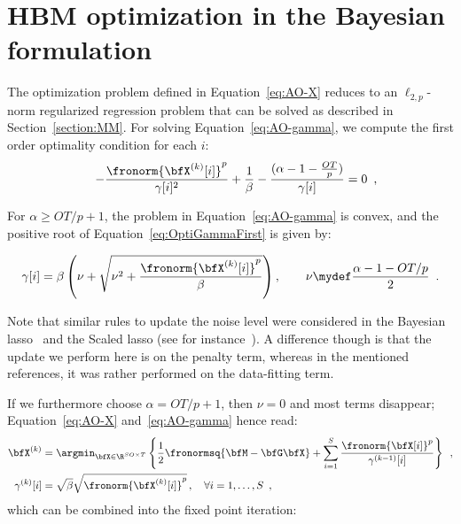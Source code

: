 \section{HBM optimization in the Bayesian formulation}
\label{section:hbm_optim}

The optimization problem defined in Equation~\eqref{eq:AO-X} reduces to an $\ell_{2,p}$-norm regularized regression problem that can be solved as described in Section~\ref{section:MM}. For solving Equation~\eqref{eq:AO-gamma}, we compute the first order optimality condition for each $i$:
\begin{eqnarray}
\label{eq:OptiGamma}
\qquad - \frac{\fronorm{\bfX^{(k)}[i]}^p}{\mathbf{\gamma}[i]^2} + \frac{1}{\beta} - \frac{( \alpha - 1 - \frac{OT}{p})}{\mathbf{\gamma}[i]} &= 0 \enspace,\label{eq:OptiGammaFirst}%
\end{eqnarray}

For $\alpha \geqslant O T/p + 1$, the problem in Equation~\eqref{eq:AO-gamma} is convex, and the positive root of Equation~\eqref{eq:OptiGammaFirst} is given by:

\begin{equation}
\mathbf{\gamma}[i] = \beta \left( \nu + \sqrt{ \nu^2 + \frac{\fronorm{\bfX^{(k)}[i]}^p}{\beta}} \right), \qquad \nu \mydef \frac{\alpha - 1 - OT/p}{2} \enspace.
\end{equation}

Note that similar rules to update the noise level were considered in the Bayesian \ac{lasso}~\cite{Park_Casella08,Kyung_Gill_Ghosh_Casella10} and the Scaled \ac{lasso} (see for instance~\cite{Stadler_Buhlmann_vandeGeer10,Dalalyan12}). A difference though is that the update we perform here is on the penalty term, whereas in the mentioned references, it was rather performed on the data-fitting term.

If we furthermore choose $\alpha = O T/p + 1$, then $\nu = 0$ and most terms disappear; Equation~\eqref{eq:AO-X} and~\eqref{eq:AO-gamma} hence read:
\begin{eqnarray}
\bfX^{(k)} &= \argmin_{\bfX\in\R^{SO \times T}} \left\lbrace \frac{1}{2} \fronormsq{\bfM -\bfG \bfX} + \sum_{i=1}^S \frac{\fronorm{\bfX[i]}^p}{\mathbf{\gamma}^{(k-1)}[i]} \right\rbrace \enspace, \label{eq:AO-nu0-X}\\
\mathbf{\gamma}^{(k)}[i] &= \sqrt{\beta} \sqrt{\fronorm{\bfX^{(k)}[i]}^p} \, , \quad \forall i=1,\ldots,S \enspace, \label{eq:AO-nu0-gamma}
\end{eqnarray}
which can be combined into the fixed point iteration:

